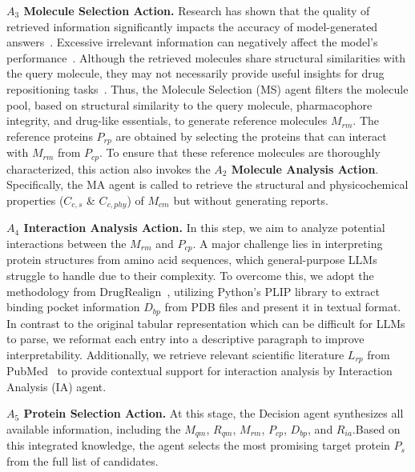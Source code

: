 \documentclass[letterpaper,twocolumn,10pt]{llncs}
\begin{document}
\textbf{$A_3$ Molecule Selection Action.}
Research has shown that the quality of retrieved information significantly impacts the accuracy of model-generated answers~\cite{csakar2025maximizing}. Excessive irrelevant information can negatively affect the model’s performance~\cite{luo2025does}. Although the retrieved molecules share structural similarities with the query molecule, they may not necessarily provide useful insights for drug repositioning tasks~\cite{lee2025rag}.
Thus, the Molecule Selection (MS) agent filters the molecule pool, based on structural similarity to the query molecule,  pharmacophore integrity, and drug-like essentials, to generate reference molecules $M_{rm}$. The reference proteins $P_{rp}$ are obtained by selecting the proteins that can interact with $M_{rm}$ from $P_{cp}$.
To ensure that these reference molecules are thoroughly characterized, this action also invokes the \textbf{$A_2$ Molecule Analysis Action}. Specifically, the MA agent is called to retrieve the structural and physicochemical properties ($C_{c,s}$ \& $C_{c,phy}$) of $M_{cm}$ but without generating reports.


\textbf{$A_4$ Interaction Analysis Action.}
In this step, we aim to analyze potential interactions between the $M_{rm}$ and $P_{cp}$. A major challenge lies in interpreting protein structures from amino acid sequences, which general-purpose LLMs struggle to handle due to their complexity.
To overcome this, we adopt the methodology from DrugRealign~\cite{wei2024drugrealign}, utilizing Python’s PLIP library to extract binding pocket information $D_{bp}$ from PDB files and present it in textual format. In contrast to the original tabular representation which can be difficult for LLMs to parse, we reformat each entry into a descriptive paragraph to improve interpretability.
Additionally, we retrieve relevant scientific literature $L_{rp}$ from PubMed~\cite{white2020pubmed} to provide contextual support for interaction analysis by Interaction Analysis (IA) agent.


\textbf{$A_5$ Protein Selection Action.}
At this stage, the Decision agent synthesizes all available information, including the $M_{qm}$, $R_{qm}$, $M_{rm}$, $P_{cp}$, $D_{bp}$, and $R_{ia}$.Based on this integrated knowledge, the agent selects the most promising target protein $P_{s}$ from the full list of candidates.
\end{document}
